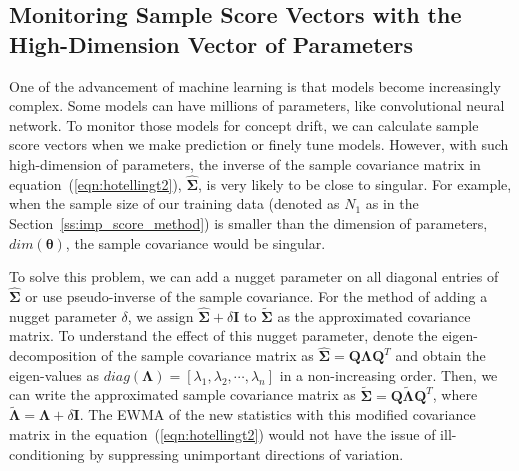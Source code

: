 \documentclass[twoside,11pt]{article}
\begin{document}



\subsection{Monitoring Sample Score Vectors with the High-Dimension Vector of Parameters}
\label{ss:high_dim_score}
One of the advancement of machine learning is that models become increasingly complex. Some models can have millions of parameters, like convolutional neural network. To monitor those models for concept drift, we can calculate sample score vectors when we make prediction or finely tune models. However, with such high-dimension of parameters, the inverse of the sample covariance matrix in equation~(\ref{eqn:hotellingt2}), $\hat {\bm { \Sigma}}$, is very likely to be close to singular. For example, when the sample size of our training data (denoted as $N_1$ as in the Section~\ref{ss:imp_score_method}) is smaller than the dimension of parameters, $dim(\bm { \theta})$, the sample covariance would be singular. 

To solve this problem, we can add a nugget parameter on all diagonal entries of $\hat {\bm { \Sigma}}$ or use pseudo-inverse of the sample covariance. For the method of adding a nugget parameter $ \delta$, we assign $\hat {\bm { \Sigma}}+ \delta \bm {I}$ to $\tilde {\bm { \Sigma}}$ as the approximated covariance matrix. To understand the effect of this nugget parameter, denote the eigen-decomposition of the sample covariance matrix as $\hat {\bm { \Sigma}} = \bm {Q}\bm { \Lambda} \bm {Q}^T$ and obtain the eigen-values as $ diag(\bm{\Lambda}) = [ \lambda_1, \lambda_2,\cdots, \lambda_n]$ in a non-increasing order. Then, we can write the approximated sample covariance matrix as $\tilde {\bm { \Sigma}} = \bm {Q}\tilde{\bm { \Lambda}} \bm {Q}^T$, where $\tilde{\bm { \Lambda}} = \bm { \Lambda} + \delta \bm {I}$. The EWMA of the new statistics with this modified covariance matrix in the equation~(\ref{eqn:hotellingt2}) would not have the issue of ill-conditioning by suppressing unimportant directions of variation. 
\end{document}

